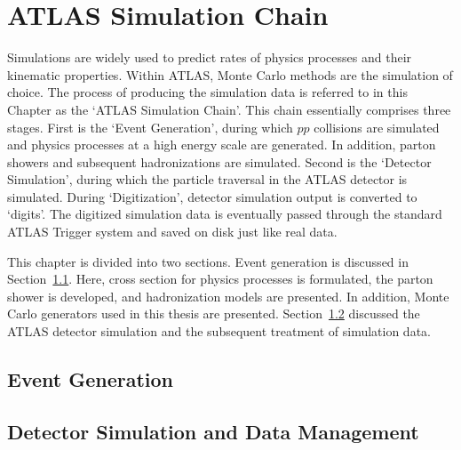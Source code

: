 \chapter{ATLAS Simulation Chain}
\begin{chapabstract}
\par Simulations are widely used to predict rates of physics processes and their kinematic properties. 
Within ATLAS, Monte Carlo methods are the simulation of choice. The process of producing the simulation 
data is referred to in this Chapter as the `ATLAS Simulation Chain'. This chain essentially comprises three 
stages. First is the `Event Generation', during which $pp$ collisions are simulated and physics processes at 
a high energy scale are generated. In addition, parton showers and subsequent hadronizations are simulated. 
Second is the `Detector Simulation', during which the particle traversal in the ATLAS detector is simulated.
During `Digitization', detector simulation output is converted to `digits'. The digitized simulation 
data is eventually passed through the standard ATLAS Trigger system and saved on disk just like real data.      

\par This chapter is divided into two sections. Event generation is discussed in Section~\ref{sec:evgen}. 
Here, cross section for physics processes is formulated, the parton shower is developed, and hadronization 
models are presented. In addition, Monte Carlo generators used in this thesis are presented. Section~\ref{sec:detsim} 
discussed the ATLAS detector simulation and the subsequent treatment of simulation data.  
\end{chapabstract}
\label{sim}

\section{Event Generation}
\label{sec:evgen}


\section{Detector Simulation and Data Management}
\label{sec:detsim}


